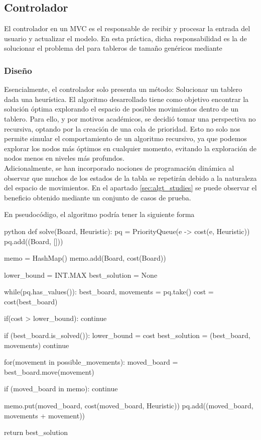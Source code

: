 \subsection{Controlador}
El controlador en un MVC es el responsable de recibir y procesar la entrada del usuario y actualizar el modelo. En esta práctica, dicha responsabilidad es la de solucionar el problema del  para tableros de tamaño genéricos mediante  

\subsubsection{Diseño}
Esencialmente, el controlador solo presenta un método: Solucionar un tablero dada una heurística. El algoritmo desarrollado tiene como objetivo encontrar la solución óptima explorando el espacio de posibles movimientos dentro de un tablero. Para ello, y por motivos académicos, se decidió tomar una perspectiva no recursiva, optando por la creación de una cola de prioridad. Esto no solo nos permite  simular el comportamiento de un algoritmo recursivo, ya que podemos explorar los nodos más óptimos en cualquier momento, evitando la exploración de nodos menos  en niveles más profundos.\\

Adicionalmente, se han incorporado nociones de programación dinámica al observar que muchos de los estados de la tabla se repetirán debido a la naturaleza del espacio de movimientos. En el apartado \ref{sec:algt_studies} se puede observar el beneficio obtenido mediante un conjunto de casos de prueba.

En pseudocódigo, el algoritmo podría tener la siguiente forma

\begin{code}{\scriptsize}{python}
def solve(Board, Heuristic):
    pq = PriorityQueue(e -> cost(e, Heuristic))
    pq.add((Board, []))

    memo = HashMap()
    memo.add(Board, cost(Board))

    lower_bound = INT.MAX
    best_solution = None

    while(pq.has_values()):
        best_board, movements = pq.take()
        cost = cost(best_board)

        if(cost > lower_bound):
            continue

        if (best_board.is_solved()):
            lower_bound = cost
            best_solution = (best_board, movements)
            continue

        for(movement in possible_movements):
            moved_board = best_board.move(movement)

            if (moved_board in memo):
                continue

            memo.put(moved_board, cost(moved_board, Heuristic))
            pq.add((moved_board, movements + movement))

    return best_solution
\end{code}

